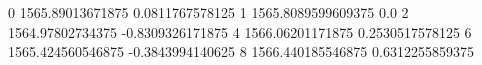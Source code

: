 0 1565.89013671875 0.0811767578125
1 1565.8089599609375 0.0
2 1564.97802734375 -0.8309326171875
4 1566.06201171875 0.2530517578125
6 1565.424560546875 -0.3843994140625
8 1566.440185546875 0.6312255859375
